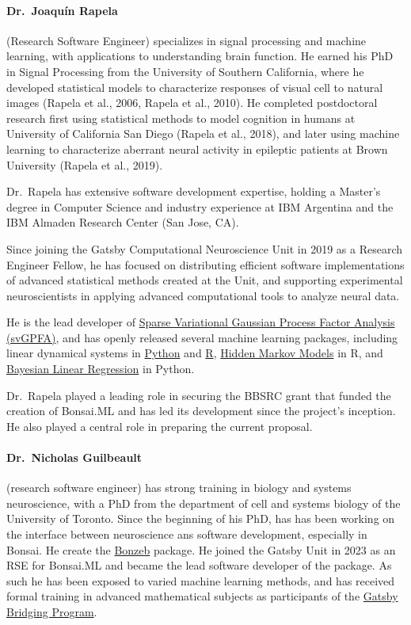 \paragraph{Dr.~Joaquín Rapela} (Research Software Engineer) specializes in
signal processing and machine learning, with applications to understanding
brain function. He earned his PhD in Signal Processing from the University of
Southern California, where he developed statistical models to characterize
responses of visual cell to natural images (Rapela et al., 2006, Rapela et al.,
2010). He completed postdoctoral research first using statistical methods to
model cognition in humans at University of California San Diego (Rapela et al.,
2018), and later using machine learning to characterize aberrant neural
activity in epileptic patients at Brown University (Rapela et al., 2019).

Dr.~Rapela has extensive software development expertise, holding a Master’s
degree in Computer Science and industry experience at IBM Argentina and the IBM
Almaden Research Center (San Jose, CA).

Since joining the Gatsby Computational Neuroscience Unit in 2019 as a Research
Engineer Fellow, he has focused on distributing efficient software
implementations of advanced statistical methods created at the Unit, and
supporting experimental neuroscientists in applying advanced computational
tools to analyze neural data.

He is the lead developer of \href{https://github.com/joacorapela/svGPFA}{Sparse
Variational Gaussian Process Factor Analysis (svGPFA)}, and has openly released
several machine learning packages, including linear dynamical systems in
\href{https://github.com/joacorapela/ssm}{Python} and
\href{https://github.com/joacorapela/kalmanFilter}{R},
\href{https://github.com/joacorapela/hiddenMarkovModels}{Hidden Markov Models}
in R, and
\href{https://github.com/joacorapela/bayesianLinearRegression}{Bayesian Linear
Regression} in Python.

Dr.~Rapela played a leading role in securing the BBSRC grant that funded the
creation of Bonsai.ML and has led its development since the project’s
inception. He also played a central role in preparing the current proposal.

\paragraph{Dr.~Nicholas Guilbeault} (research software engineer) has strong
training in biology and systems neuroscience, with a PhD from the department of
cell and systems biology of the University of Toronto.
%
Since the beginning of his PhD, has has been working on the interface between
neuroscience ans software development, especially in Bonsai. He create the
\href{https://ncguilbeault.github.io/BonZeb/}{Bonzeb} package.
%
He joined the Gatsby Unit in 2023 as an RSE for Bonsai.ML and became the lead
software developer of the package.
%
As such he has been exposed to varied machine learning methods, and has
received formal training in advanced mathematical subjects as participants of
the
\href{https://www.ucl.ac.uk/gatsby/study-and-work/gatsby-bridging-programme}{Gatsby
Bridging Program}.

